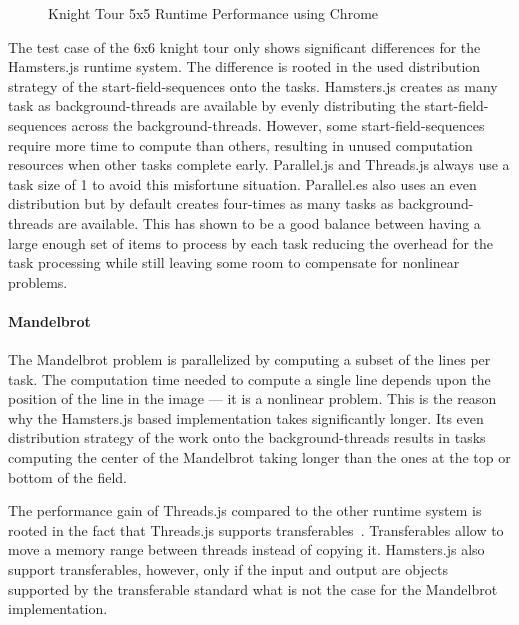 \begin{figure}
	\centering
	
	\caption{Knight Tour 5x5 Runtime Performance using Chrome}
	\label{fig:runtime-performance-chrome}
\end{figure}

The test case of the 6x6 knight tour only shows significant differences for the Hamsters.js runtime system. The difference is rooted in the used distribution strategy of the start-field-sequences onto the tasks. Hamsters.js creates as many task as background-threads are available by evenly distributing the start-field-sequences across the background-threads. However, some start-field-sequences require more time to compute than others, resulting in unused computation resources when other tasks complete early. Parallel.js and Threads.js always use a task size of 1 to avoid this misfortune situation. Parallel.es also uses an even distribution but by default creates four-times as many tasks as background-threads are available. This has shown to be a good balance between having a large enough set of items to process by each task reducing the overhead for the task processing while still leaving some room to compensate for nonlinear problems. 

\paragraph{Mandelbrot}
The Mandelbrot problem is parallelized by computing a subset of the lines per task. The computation time needed to compute a single line depends upon the position of the line in the image --- it is a nonlinear problem. This is the reason why the Hamsters.js based implementation takes significantly longer. Its even distribution strategy of the work onto the background-threads results in tasks computing the center of the Mandelbrot taking longer than the ones at the top or bottom of the field. 

The performance gain of Threads.js compared to the other runtime system is rooted in the fact that Threads.js supports transferables~\cite[Section 2.7.4]{w3cHtml5}. Transferables allow to move a memory range between threads instead of copying it. Hamsters.js also support transferables, however, only if the input and output are objects supported by the transferable standard what is not the case for the Mandelbrot implementation.

